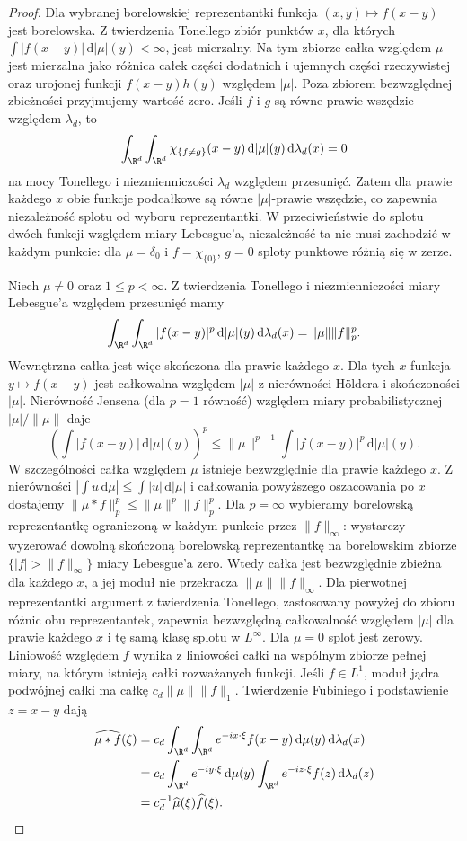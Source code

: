 \begin{proof}
Dla wybranej borelowskiej reprezentantki funkcja
$(x,y)\mapsto f(x-y)$ jest borelowska. Z twierdzenia Tonellego zbiór punktów $x$, dla których
$\int |f(x-y)|\,\mathrm d|\mu|(y)<\infty$, jest mierzalny.
Na tym zbiorze całka względem $\mu$ jest mierzalna
jako różnica całek części dodatnich i ujemnych części
rzeczywistej oraz urojonej funkcji $f(x-y)h(y)$
względem $|\mu|$. Poza zbiorem bezwzględnej zbieżności
przyjmujemy wartość zero.
Jeśli $f$ i $g$ są równe prawie wszędzie względem
$\lambda_d$, to
\[
 \int_{\R^d}\int_{\R^d}
 \chi_{\{f\ne g\}}(x-y)\,\mathrm d|\mu|(y)
 \,\mathrm d\lambda_d(x)=0
\]
na mocy Tonellego i niezmienniczości $\lambda_d$
względem przesunięć. Zatem dla prawie każdego $x$
obie funkcje podcałkowe są równe $|\mu|$-prawie
wszędzie, co zapewnia niezależność splotu od wyboru
reprezentantki. W przeciwieństwie do splotu dwóch
funkcji względem miary Lebesgue'a, niezależność ta
nie musi zachodzić w każdym punkcie: dla $\mu=\delta_0$
i $f=\chi_{\{0\}}$, $g=0$ sploty punktowe różnią się w zerze.

Niech $\mu\ne0$ oraz $1\le p<\infty$.
Z twierdzenia Tonellego i niezmienniczości miary
Lebesgue'a względem przesunięć mamy
\[
 \int_{\R^d}\int_{\R^d}|f(x-y)|^p\,\mathrm d|\mu|(y)
 \,\mathrm d\lambda_d(x)=\|\mu\|\|f\|_p^p.
\]
Wewnętrzna całka jest więc skończona dla prawie każdego
$x$. Dla tych $x$ funkcja $y\mapsto f(x-y)$ jest
całkowalna względem $|\mu|$ z nierówności Höldera
i skończoności $|\mu|$. Nierówność Jensena (dla $p=1$
równość) względem miary probabilistycznej
$|\mu|/\|\mu\|$ daje
\[
 \left(\int|f(x-y)|\,\mathrm d|\mu|(y)\right)^p
 \le \|\mu\|^{p-1}\int|f(x-y)|^p\,\mathrm d|\mu|(y).
\]
W szczególności całka względem $\mu$ istnieje
bezwzględnie dla prawie każdego $x$. Z nierówności
$|\int u\,\mathrm d\mu|\le\int|u|\,\mathrm d|\mu|$
i całkowania powyższego oszacowania po $x$ dostajemy
$\|\mu*f\|_p^p\le\|\mu\|^p\|f\|_p^p$. Dla $p=\infty$ wybieramy
borelowską reprezentantkę ograniczoną w każdym punkcie
przez $\|f\|_\infty$: wystarczy wyzerować dowolną
skończoną borelowską reprezentantkę na borelowskim
zbiorze $\{|f|>\|f\|_\infty\}$ miary Lebesgue'a zero.
Wtedy całka jest bezwzględnie zbieżna dla każdego $x$,
a jej moduł nie przekracza $\|\mu\|\|f\|_\infty$.
Dla pierwotnej reprezentantki argument z twierdzenia
Tonellego, zastosowany powyżej do zbioru różnic obu
reprezentantek, zapewnia bezwzględną całkowalność
względem $|\mu|$ dla prawie każdego $x$ i tę samą
klasę splotu w $L^\infty$. Dla $\mu=0$ splot jest
zerowy. Liniowość względem $f$ wynika z liniowości
całki na wspólnym zbiorze pełnej miary, na którym
istnieją całki rozważanych funkcji.
Jeśli $f\in L^1$, moduł jądra podwójnej całki
ma całkę $c_d\|\mu\|\|f\|_1$. Twierdzenie Fubiniego
i podstawienie $z=x-y$ dają
\[
\begin{aligned}
 \widehat{\mu*f}(\xi)
 &=c_d\int_{\R^d}\int_{\R^d}
 e^{-ix\cdot\xi}f(x-y)\,\mathrm d\mu(y)\,\mathrm d\lambda_d(x)\\
 &=c_d\int_{\R^d}e^{-iy\cdot\xi}\,\mathrm d\mu(y)
       \int_{\R^d}e^{-iz\cdot\xi}f(z)\,\mathrm d\lambda_d(z)\\
 &=c_d^{-1}\widehat\mu(\xi)\widehat f(\xi).
\end{aligned}
\]
\end{proof}

